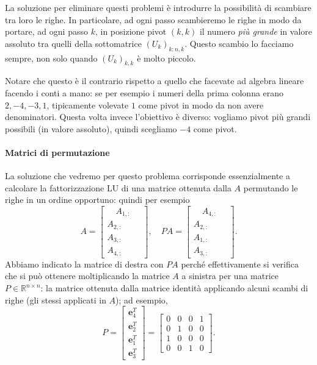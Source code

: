 \documentclass[a4paper]{report}
\theoremstyle{definiton}
\theoremstyle{remark}
\begin{document}
La soluzione per eliminare questi problemi è introdurre la possibilità di scambiare tra loro le righe. In particolare, ad ogni passo scambieremo le righe in modo da portare, ad ogni passo $k$, in posizione pivot $(k,k)$ il numero \emph{più grande} in valore assoluto tra quelli della sottomatrice $(U_k)_{k:n,k}$. Questo scambio lo facciamo sempre, non solo quando $(U_k)_{k,k}$ è molto piccolo.

Notare che questo è il contrario rispetto a quello che facevate ad algebra lineare facendo i conti a mano: se per esempio i numeri della prima colonna erano $2,-4,-3,1$, tipicamente volevate $1$ come pivot in modo da non avere denominatori. Questa volta invece l'obiettivo è diverso: vogliamo pivot più grandi possibili (in valore assoluto), quindi scegliamo $-4$ come pivot.

\paragraph{Matrici di permutazione}
La soluzione che vedremo per questo problema corrisponde essenzialmente a calcolare la fattorizzazione LU di una matrice ottenuta dalla $A$ permutando le righe in un ordine opportuno: quindi per esempio
\[
A = \begin{bmatrix}
    \hspace{1em} A_{1,:} \hspace{1em}  \\
    A_{2,:} \\
    A_{3,:} \\
    A_{4,:}
\end{bmatrix}, \quad
PA = \begin{bmatrix}
    \hspace{1em} A_{4,:} \hspace{1em}\\
    A_{2,:}\\
    A_{1,:}\\
    A_{3,:}
\end{bmatrix}.
\]
Abbiamo indicato la matrice di destra con $PA$ perché effettivamente si verifica che si può ottenere moltiplicando la matrice $A$ a sinistra per una matrice $P\in\mathbb{R}^{n\times n}$: la matrice ottenuta dalla matrice identità applicando alcuni scambi di righe (gli stessi applicati in $A$); ad esempio,
\[
P = 
\begin{bmatrix}
    \mathbf{e}_4^T\\
    \mathbf{e}_2^T\\
    \mathbf{e}_1^T\\
    \mathbf{e}_3^T
\end{bmatrix}
=
\begin{bmatrix}
    0 & 0 & 0 & 1\\
    0 & 1 & 0 & 0\\
    1 & 0 & 0 & 0\\
    0 & 0 & 1 & 0
\end{bmatrix}.
\]
\end{document}
